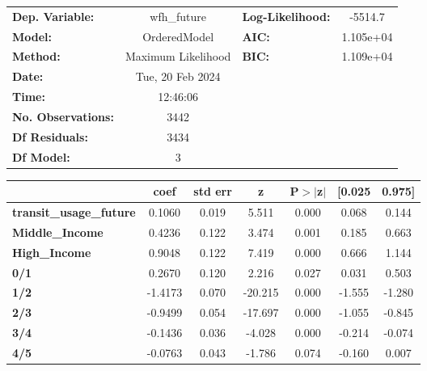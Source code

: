 \documentclass{report}
\begin{document}
\begin{center}
\begin{tabular}{lclc}
\toprule
\textbf{Dep. Variable:}         &    wfh\_future     & \textbf{  Log-Likelihood:    } &   -5514.7   \\
\textbf{Model:}                 &    OrderedModel    & \textbf{  AIC:               } & 1.105e+04   \\
\textbf{Method:}                & Maximum Likelihood & \textbf{  BIC:               } & 1.109e+04   \\
\textbf{Date:}                  &  Tue, 20 Feb 2024  & \textbf{                     } &             \\
\textbf{Time:}                  &      12:46:06      & \textbf{                     } &             \\
\textbf{No. Observations:}      &         3442       & \textbf{                     } &             \\
\textbf{Df Residuals:}          &         3434       & \textbf{                     } &             \\
\textbf{Df Model:}              &            3       & \textbf{                     } &             \\
\bottomrule
\end{tabular}
\begin{tabular}{lcccccc}
                                & \textbf{coef} & \textbf{std err} & \textbf{z} & \textbf{P$> |$z$|$} & \textbf{[0.025} & \textbf{0.975]}  \\
\midrule
\textbf{transit\_usage\_future} &       0.1060  &        0.019     &     5.511  &         0.000        &        0.068    &        0.144     \\
\textbf{Middle\_Income}         &       0.4236  &        0.122     &     3.474  &         0.001        &        0.185    &        0.663     \\
\textbf{High\_Income}           &       0.9048  &        0.122     &     7.419  &         0.000        &        0.666    &        1.144     \\
\textbf{0/1}                    &       0.2670  &        0.120     &     2.216  &         0.027        &        0.031    &        0.503     \\
\textbf{1/2}                    &      -1.4173  &        0.070     &   -20.215  &         0.000        &       -1.555    &       -1.280     \\
\textbf{2/3}                    &      -0.9499  &        0.054     &   -17.697  &         0.000        &       -1.055    &       -0.845     \\
\textbf{3/4}                    &      -0.1436  &        0.036     &    -4.028  &         0.000        &       -0.214    &       -0.074     \\
\textbf{4/5}                    &      -0.0763  &        0.043     &    -1.786  &         0.074        &       -0.160    &        0.007     \\
\bottomrule
\end{tabular}
\end{center}
\end{document}
